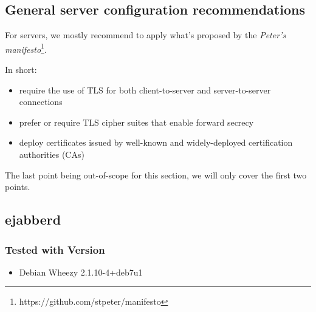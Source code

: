 

\subsection{General server configuration recommendations}

For servers, we mostly recommend to apply what's proposed by the {\it Peter's manifesto}\footnote{https://github.com/stpeter/manifesto}.

In short:
\begin{itemize}
    \item require the use of TLS for both client-to-server and server-to-server connections
    \item prefer or require TLS cipher suites that enable forward secrecy
    \item deploy certificates issued by well-known and widely-deployed certification authorities (CAs)
\end{itemize}

The last point being out-of-scope for this section, we will only cover the first two points.


\subsection{ejabberd}
\subsubsection{Tested with Version}
\begin{itemize}
  \item Debian Wheezy 2.1.10-4+deb7u1
\end{itemize}


